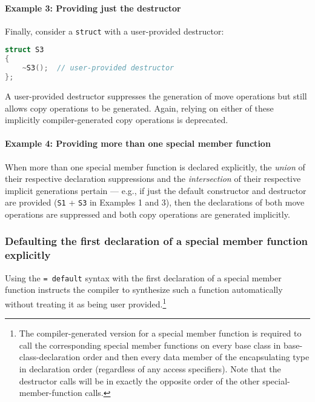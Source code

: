 \paragraph[Example 3: Providing just the destructor]{Example 3: Providing just the destructor}\label{example-3:-providing-just-the-destructor}

Finally, consider a \texttt{struct} with a user-provided destructor:


\begin{lstlisting}[language=C++]
struct S3
{
    ~S3();  // user-provided destructor
};
\end{lstlisting}

\noindent A user-provided destructor suppresses the generation of move
operations but still allows copy operations to be generated. Again,
relying on either of these implicitly compiler-generated copy
operations is deprecated.

\paragraph[Example 4: Providing more than one special member function]{Example 4: Providing more than one special member function}\label{example-4:-providing-more-than-one-special-member}

When more than one special member function is declared explicitly, the
\emph{union} of their respective declaration suppressions and the
\emph{intersection} of their respective implicit generations pertain ---
e.g., if just the default constructor and destructor are provided
(\texttt{S1} + \texttt{S3} in Examples 1 and 3), then the declarations of both move
operations are suppressed and both copy operations are generated
implicitly.

\subsubsection[Defaulting the first declaration of a special member function explicitly]{Defaulting the first declaration of a special member function explicitly}\label{defaulting-the-first-declaration-of-a-special-member-function-explicitly}

Using the \texttt{=}~\texttt{default} syntax with the first declaration
of a special member function instructs the compiler to synthesize such a
function automatically without treating it as being
user provided.{\cprotect\footnote{The compiler-generated version for a
special member function is required to call the corresponding special
member functions on every base class in base-class-declaration
order and then every data member of the encapsulating type in
declaration order (regardless of any access specifiers). Note that the
destructor calls will be in exactly the opposite order of the
  other special-member-function calls.}}

